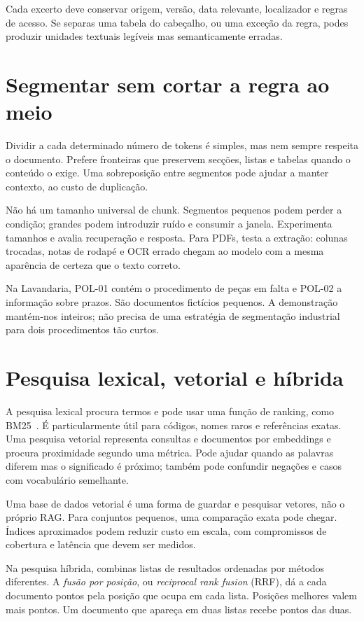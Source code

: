 Cada excerto deve conservar origem, versão, data relevante, localizador e regras de acesso. Se separas uma tabela do cabeçalho, ou uma exceção da regra, podes produzir unidades textuais legíveis mas semanticamente erradas.

\section{Segmentar sem cortar a regra ao meio}
Dividir a cada determinado número de tokens é simples, mas nem sempre respeita o documento. Prefere fronteiras que preservem secções, listas e tabelas quando o conteúdo o exige. Uma sobreposição entre segmentos pode ajudar a manter contexto, ao custo de duplicação.

Não há um tamanho universal de chunk. Segmentos pequenos podem perder a condição; grandes podem introduzir ruído e consumir a janela. Experimenta tamanhos e avalia recuperação e resposta. Para PDFs, testa a extração: colunas trocadas, notas de rodapé e OCR errado chegam ao modelo com a mesma aparência de certeza que o texto correto.

Na Lavandaria, POL-01 contém o procedimento de peças em falta e POL-02 a informação sobre prazos. São documentos fictícios pequenos. A demonstração mantém-nos inteiros; não precisa de uma estratégia de segmentação industrial para dois procedimentos tão curtos.

\section{Pesquisa lexical, vetorial e híbrida}
A pesquisa lexical procura termos e pode usar uma função de ranking, como BM25~\citep{robertson2009}. É particularmente útil para códigos, nomes raros e referências exatas. Uma pesquisa vetorial representa consultas e documentos por embeddings e procura proximidade segundo uma métrica. Pode ajudar quando as palavras diferem mas o significado é próximo; também pode confundir negações e casos com vocabulário semelhante.

Uma base de dados vetorial é uma forma de guardar e pesquisar vetores, não o próprio RAG. Para conjuntos pequenos, uma comparação exata pode chegar. Índices aproximados podem reduzir custo em escala, com compromissos de cobertura e latência que devem ser medidos.

Na pesquisa híbrida, combinas listas de resultados ordenadas por métodos diferentes. A \emph{fusão por posição}, ou \emph{reciprocal rank fusion} (RRF), dá a cada documento pontos pela posição que ocupa em cada lista. Posições melhores valem mais pontos. Um documento que apareça em duas listas recebe pontos das duas.

